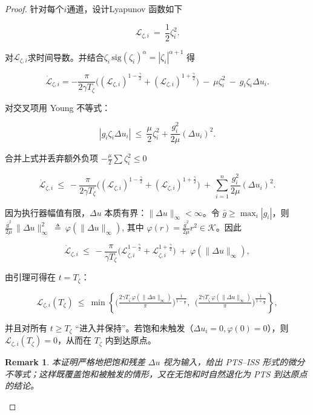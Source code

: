 \documentclass[pdflatex,sn-mathphys-num]{sn-jnl}%
\theoremstyle{thmstyleone}%
\theoremstyle{thmstyletwo}%
\newtheorem{remark}{Remark}%
\theoremstyle{thmstylethree}%
\begin{document}
	\begin{proof}
	
	针对每个$i$通道，设计Lyapunov 函数如下
	
	$$
	\mathcal{L}_{\zeta,i}\ =\ \frac12\zeta_i^2.
	$$
	
	对$\mathcal{L}_{\zeta,i}$求时间导数。并结合$\zeta_i\,\mathrm{sig}(\zeta_i)^\alpha=|\zeta_i|^{\alpha+1}$ 得
	
	$$
	\dot{\mathcal{L}}_{\zeta,i}= -\frac{\pi}{2\gamma T_\zeta}\Big((\mathcal{L}_{\zeta,i})^{1-\frac{\gamma}{2}}+(\mathcal{L}_{\zeta,i})^{1+\frac{\gamma}{2}}\Big)\ -\ \mu\zeta_i^2\ -\  g_i\zeta_i\Delta u_i.
	$$
	
	
	
	对交叉项用 Young 不等式：
	
	$$
	|g_i\zeta_i\Delta u_i|\ \le\ \frac{\mu}{2}\zeta_i^2+\frac{g_i^2}{2\mu}(\Delta u_i)^2 .
	$$
	
	合并上式并丢弃额外负项 $-\frac{\mu}{2}\sum\zeta_i^2\le0$
	
	$$
		\dot{\mathcal{L}}_{\zeta,i}
	\ \le\
	-\frac{\pi}{2\gamma T_\zeta}\Big((\mathcal{L}_{\zeta,i})^{1-\frac{\gamma}{2}}+(\mathcal{L}_{\zeta,i})^{1+\frac{\gamma}{2}}\Big)
	\ +\ \sum_{i=1}^{n}\frac{g_i^2}{2\mu}(\Delta u_i)^2.
	$$
	

	因为执行器幅值有限，$\Delta u$ 本质有界：$\|\Delta u\|_\infty<\infty$。令 $\bar g\ge \max_i|g_i|$，则
	$\frac{\bar g^2}{2\mu}\,\|\Delta u\|_\infty^2\ \triangleq\ \varphi (\|\Delta u\|_\infty)$, 其中 $\varphi (r)=\frac{\bar g^2}{2\mu} r^2\in\mathcal K$。因此
	 
	$$
	\dot{\mathcal{L}}_{\zeta,i}
	\ \le\
	-\frac{\pi}{\gamma T_\zeta}\Big(\mathcal{L}_{\zeta,i}^{1-\frac{\gamma}{2}}+\mathcal{L}_{\zeta,i}^{1+\frac{\gamma}{2}}\Big)
	\ +\ \varphi (\|\Delta u\|_\infty),
	$$
	
	
	由引理可得在 $t=T_\zeta$：
	
	$$
	\mathcal{L}_{\zeta,i}(T_\zeta)\ \le\
	\min\!\left\{
	\Big(\tfrac{2\gamma T_\zeta\,\varphi (\|\Delta u\|_\infty)}{\pi}\Big)^{\!\frac{1}{1-\frac{\gamma}{2}}},
	\ \ 
	\Big(\tfrac{2\gamma T_\zeta\,\varphi (\|\Delta u\|_\infty)}{\pi}\Big)^{\!\frac{1}{1+\frac{\gamma}{2}}}
	\right\},
	$$
	 
	并且对所有 $t\ge T_\zeta$ “进入并保持”。若饱和未触发（$\Delta u_i=0, \varphi (0)=0$），则 $\mathcal{L}_{\zeta,i}(T_\zeta)=0$，从而在 $T_\zeta$ 内到达原点。
	
	\begin{remark}
	本证明严格地把饱和残差 $\Delta u$ 视为输入，给出 PTS–ISS 形式的微分不等式；这样既覆盖饱和被触发的情形，又在无饱和时自然退化为 PTS 到达原点的结论。
	\end{remark}
	
	\end{proof}
	
\end{document}
